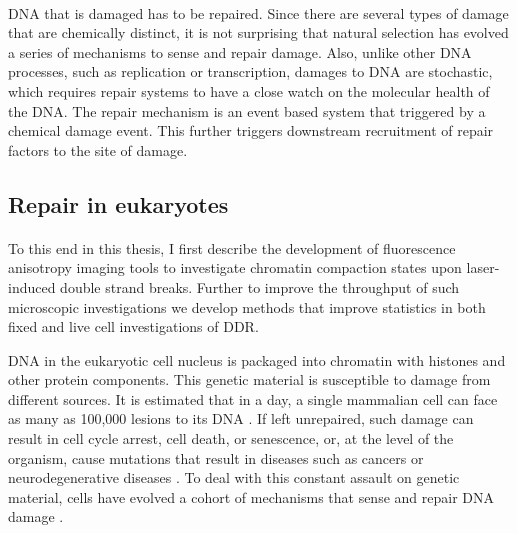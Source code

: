 \paragraph*{} DNA that is damaged has to be repaired. Since there are several types of damage that are chemically distinct, it is not surprising that natural selection has evolved a series of mechanisms to sense and repair damage. Also, unlike other DNA processes, such as replication or transcription, damages to DNA are stochastic, which requires repair systems to have a close watch on the molecular health of the DNA. The repair mechanism is an event based system that triggered by a chemical damage event. This further triggers downstream recruitment of repair factors to the site of damage.

\subsection{Repair in eukaryotes}
\paragraph*{} To this end in this thesis, I first describe the development of fluorescence anisotropy imaging tools to investigate chromatin compaction states upon laser-induced double strand breaks. Further to improve the throughput of such microscopic investigations we develop methods that improve statistics in both fixed and live cell investigations of DDR.



DNA in the eukaryotic cell nucleus is packaged into chromatin with histones and other protein components. This genetic material is susceptible to damage from different sources. It is estimated that in a day, a single mammalian cell can face as many as 100,000 lesions to its DNA \cite{ciccia2010dna}. If left unrepaired, such damage can result in cell cycle arrest, cell death, or senescence, or, at the level of the organism, cause mutations that result in diseases such as cancers or neurodegenerative diseases \cite{friedberg2005dna, madabhushi2014dna}. To deal with this constant assault on genetic material, cells have evolved a cohort of mechanisms that sense and repair DNA damage \cite{hoeijmakers2009dna}.

